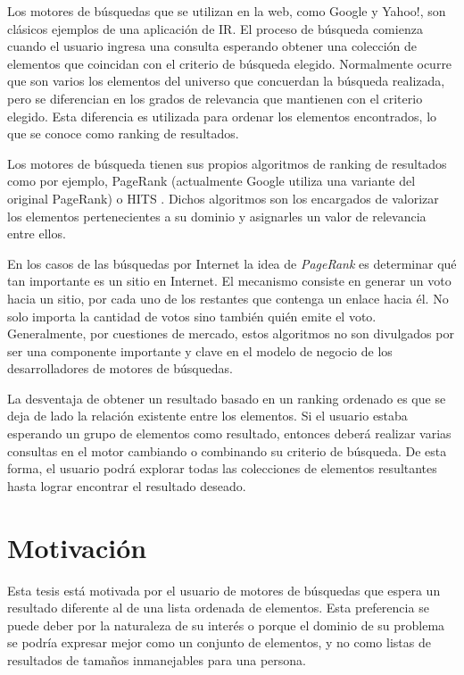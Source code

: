 Los motores de búsquedas que se utilizan en la web, como Google y Yahoo!, son clásicos ejemplos de una aplicación de IR. El proceso de búsqueda comienza cuando el usuario ingresa una consulta esperando obtener una colección de elementos que coincidan con el criterio de búsqueda elegido. Normalmente ocurre que son varios los elementos del universo que concuerdan la búsqueda realizada, pero se diferencian en los grados de relevancia que mantienen con el criterio elegido. Esta diferencia es utilizada para ordenar los elementos encontrados, lo que se conoce como ranking de resultados.

Los motores de búsqueda tienen sus propios algoritmos de ranking de resultados como por ejemplo, PageRank (actualmente Google utiliza una variante del original PageRank) \cite{Brin:1998:ALH:297810.297827} o HITS \cite{Kleinberg:1999:ASH:324133.324140}. Dichos algoritmos son los encargados de valorizar los elementos pertenecientes a su dominio y asignarles un valor de relevancia entre ellos. 

En los casos de las búsquedas por Internet la idea de \textit{PageRank} \cite{Brin:1998:ALH:297810.297827} es determinar qué tan importante es un sitio en Internet. El mecanismo consiste en generar un voto hacia un sitio, por cada uno de los restantes que contenga un enlace hacia él. No solo importa la cantidad de votos sino también quién emite el voto. Generalmente, por cuestiones de mercado, estos algoritmos no son divulgados por ser una componente importante y clave en el modelo de negocio de los desarrolladores de motores de búsquedas. 

La desventaja de obtener un resultado basado en un ranking ordenado es que se deja de lado la relación existente entre los elementos. Si el usuario estaba esperando un grupo de elementos como resultado, entonces deberá realizar varias consultas en el motor cambiando o combinando su criterio de búsqueda. De esta forma, el usuario podrá explorar todas las colecciones de elementos resultantes hasta lograr encontrar el resultado deseado.

\section{Motivación}
Esta tesis está motivada por el usuario de motores de búsquedas que espera un resultado diferente al de una lista ordenada de elementos. Esta preferencia se puede deber por la naturaleza de su interés o porque el dominio de su problema se podría expresar mejor como un conjunto de elementos, y no como listas de resultados de tamaños inmanejables para una persona.

